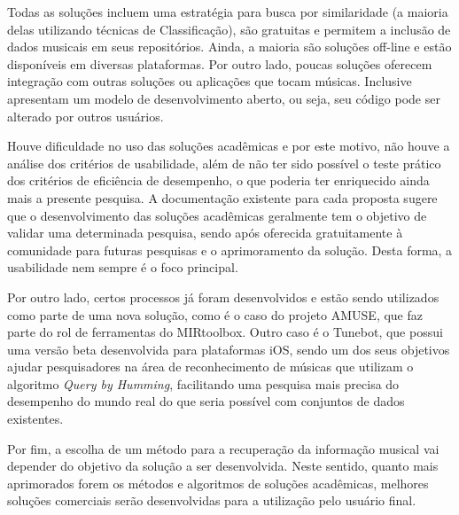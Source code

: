Todas as soluções incluem uma estratégia para busca por similaridade (a maioria delas utilizando técnicas de Classificação), são gratuitas e permitem a inclusão de dados musicais em seus repositórios. Ainda, a maioria são soluções off-line e estão disponíveis em diversas plataformas. Por outro lado, poucas soluções oferecem integração com outras soluções ou aplicações que tocam músicas. Inclusive apresentam um modelo de desenvolvimento aberto, ou seja, seu código pode ser alterado por outros usuários.

Houve dificuldade no uso das soluções acadêmicas e por este motivo, não houve a análise dos critérios de usabilidade, além de não ter sido possível o teste prático dos critérios de eficiência de desempenho, o que poderia ter enriquecido ainda mais a presente pesquisa. A documentação existente para cada proposta sugere que o desenvolvimento das soluções acadêmicas geralmente tem o objetivo de validar uma determinada pesquisa, sendo após oferecida gratuitamente à comunidade para futuras pesquisas e o aprimoramento da solução. Desta forma, a usabilidade nem sempre é o foco principal. 

Por outro lado, certos processos já foram desenvolvidos e estão sendo utilizados como parte de uma nova solução, como é o caso do projeto AMUSE, que faz parte do rol de ferramentas do MIRtoolbox. Outro caso é o Tunebot, que possui uma versão beta desenvolvida para plataformas iOS, sendo um dos seus objetivos ajudar pesquisadores na área de reconhecimento de músicas que utilizam o algoritmo \textit{Query by Humming}, facilitando uma pesquisa mais precisa do desempenho do mundo real do que seria possível com conjuntos de dados existentes.

Por fim, a escolha de um método para a recuperação da informação musical vai depender do objetivo da solução a ser desenvolvida. Neste sentido, quanto mais aprimorados forem os métodos e algoritmos de soluções acadêmicas, melhores soluções comerciais serão desenvolvidas para a utilização pelo usuário final.
